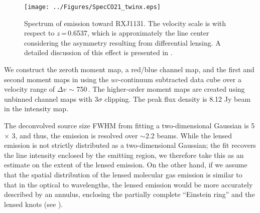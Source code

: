 \documentclass[]{emulateapj}
\begin{document}
\begin{figure}[!htbp]
\centering
\texttt{[image: ../Figures/SpecCO21\_twinx.eps]}
\caption{ Spectrum of \bco emission toward RXJ1131. The velocity scale
is with respect to $z$\,=\,0.6537, which is approximately the line center
considering the asymmetry resulting from differential lensing.
A detailed discussion of this effect is presented in
.
 \label{fig:CO21spec}}
\end{figure}

We construct the zeroth moment map, a red/blue channel map, and
the first and second moment maps in 
using the $uv$-continuum subtracted data cube over a velocity range of
$\Delta v$ $\sim$ 750\,\kms.
The higher-order moment maps are created using
unbinned channel maps with 3$\sigma$ clipping.
The peak flux density is 8.12 Jy\,\kms\,beam\pmOne
in the intensity map.

The deconvolved source size FWHM from fitting a two-dimensional Gaussian
is 5 $\times$ 3,
and thus, the emission is resolved over $\sim$2.2 beams.
While the lensed emission is not strictly distributed as a two-dimensional
Gaussian;
the fit recovers the line intensity enclosed by the emitting
region, we therefore take this as an estimate on the extent of the lensed
emission. On the other hand, if we assume that the spatial distribution of
the lensed molecular gas emission is similar to that in the optical to \nir
wavelengths, the lensed emission would be more accurately described by an
annulus, enclosing the partially complete ``Einstein ring'' and
the lensed knots (see ).
\end{document}
